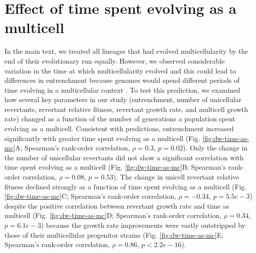 \documentclass[
]{book}
\begin{document}
\hypertarget{effect-of-time-spent-evolving-as-a-multicell}{%
\section{Effect of time spent evolving as a multicell}\label{effect-of-time-spent-evolving-as-a-multicell}}

In the main text, we treated all lineages that had evolved multicellularity by the end of their evolutionary run equally. However, we observed considerable variation in the time at which multicellularity evolved and this could lead to differences in entrenchment because genomes would spend different periods of time evolving in a multicellular context \citep{libby2016stabilizing}. To test this prediction, we examined how several key parameters in our study (entrenchment, number of unicellular revertants, revertant relative fitness, revertant growth rate, and multicell growth rate) changed as a function of the number of generations a population spent evolving as a multicell. Consistent with predictions, entrenchment increased significantly with greater time spent evolving as a multicell (Fig. \ref{fig:dw-time-as-mc}A; Spearman's rank-order correlation, \(\rho=0.3\), \(p=0.02\)). Only the change in the number of unicellular revertants did not show a significant correlation with time spent evolving as a multicell (Fig. \ref{fig:dw-time-as-mc}B; Spearman's rank-order correlation, \(\rho=0.08\), \(p=0.53\)). The change in unicell revertant relative fitness declined strongly as a function of time spent evolving as a multicell (Fig. \ref{fig:dw-time-as-mc}C; Spearman's rank-order correlation, \(\rho=-0.34\), \(p=5.5e-3\)) despite the positive correlation between revertant growth rate and time as multicell (Fig. \ref{fig:dw-time-as-mc}D; Spearman's rank-order correlation, \(\rho=0.34\), \(p=6.1e-3\)) because the growth rate improvements were vastly outstripped by those of their multicellular progenitor strains (Fig. \ref{fig:dw-time-as-mc}E; Spearman's rank-order correlation, \(\rho=0.86\), \(p<2.2e-16\)).
\end{document}
